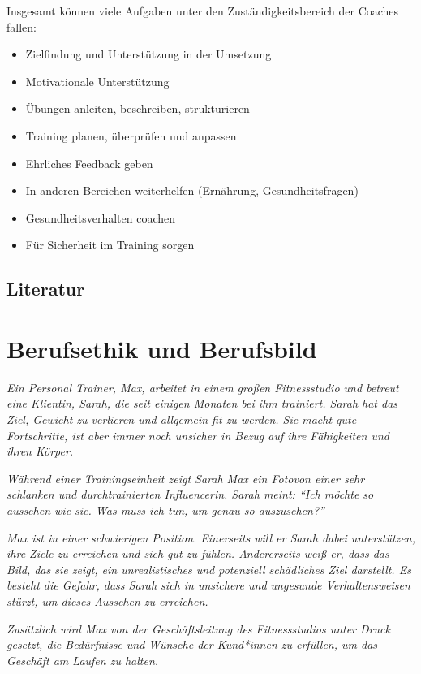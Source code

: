 \documentclass[
  letterpaper,
  DIV=11,
  numbers=noendperiod]{scrreprt}
\providecommand{\tightlist}{%
  \setlength{\itemsep}{0pt}\setlength{\parskip}{0pt}}
\begin{document}
Insgesamt können viele Aufgaben unter den Zuständigkeitsbereich der
Coaches fallen:

\begin{itemize}
\tightlist
\item
  Zielfindung und Unterstützung in der Umsetzung
\item
  Motivationale Unterstützung
\item
  Übungen anleiten, beschreiben, strukturieren
\item
  Training planen, überprüfen und anpassen
\item
  Ehrliches Feedback geben
\item
  In anderen Bereichen weiterhelfen (Ernährung, Gesundheitsfragen)
\item
  Gesundheitsverhalten coachen
\item
  Für Sicherheit im Training sorgen
\end{itemize}

\section{Literatur}\label{literatur-2}


\chapter{Berufsethik und Berufsbild}\label{sec-berufsethik}

\emph{Ein Personal Trainer, Max, arbeitet in einem großen Fitnessstudio
und betreut eine Klientin, Sarah, die seit einigen Monaten bei ihm
trainiert. Sarah hat das Ziel, Gewicht zu verlieren und allgemein fit zu
werden. Sie macht gute Fortschritte, ist aber immer noch unsicher in
Bezug auf ihre Fähigkeiten und ihren Körper.}

\emph{Während einer Trainingseinheit zeigt Sarah Max ein Fotovon einer
sehr schlanken und durchtrainierten Influencerin. Sarah meint: ``Ich
möchte so aussehen wie sie. Was muss ich tun, um genau so auszusehen?''}

\emph{Max ist in einer schwierigen Position. Einerseits will er Sarah
dabei unterstützen, ihre Ziele zu erreichen und sich gut zu fühlen.
Andererseits weiß er, dass das Bild, das sie zeigt, ein unrealistisches
und potenziell schädliches Ziel darstellt. Es besteht die Gefahr, dass
Sarah sich in unsichere und ungesunde Verhaltensweisen stürzt, um dieses
Aussehen zu erreichen.}

\emph{Zusätzlich wird Max von der Geschäftsleitung des Fitnessstudios
unter Druck gesetzt, die Bedürfnisse und Wünsche der Kund*innen zu
erfüllen, um das Geschäft am Laufen zu halten.}
\end{document}
